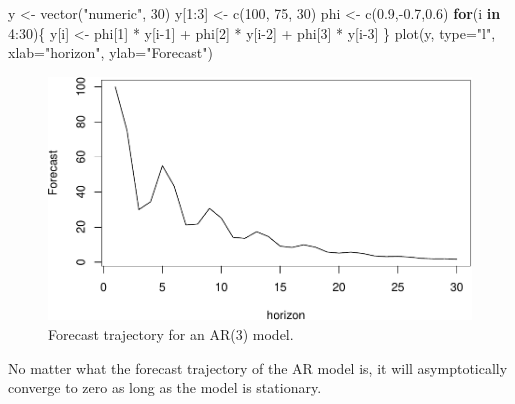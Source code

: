 \documentclass[
]{book}
\newenvironment{Shaded}{\begin{snugshade}}{\end{snugshade}}
\newcommand{\AttributeTok}[1]{\textcolor[rgb]{0.77,0.63,0.00}{#1}}
\newcommand{\ControlFlowTok}[1]{\textcolor[rgb]{0.13,0.29,0.53}{\textbf{#1}}}
\newcommand{\DecValTok}[1]{\textcolor[rgb]{0.00,0.00,0.81}{#1}}
\newcommand{\FloatTok}[1]{\textcolor[rgb]{0.00,0.00,0.81}{#1}}
\newcommand{\FunctionTok}[1]{\textcolor[rgb]{0.00,0.00,0.00}{#1}}
\newcommand{\NormalTok}[1]{#1}
\newcommand{\OtherTok}[1]{\textcolor[rgb]{0.56,0.35,0.01}{#1}}
\newcommand{\SpecialCharTok}[1]{\textcolor[rgb]{0.00,0.00,0.00}{#1}}
\newcommand{\StringTok}[1]{\textcolor[rgb]{0.31,0.60,0.02}{#1}}
\theoremstyle{definition}
\theoremstyle{definition}
\theoremstyle{definition}
\theoremstyle{definition}
\theoremstyle{remark}
\begin{document}
\begin{Shaded}
\begin{Highlighting}[]
\NormalTok{y }\OtherTok{\textless{}{-}} \FunctionTok{vector}\NormalTok{(}\StringTok{"numeric"}\NormalTok{, }\DecValTok{30}\NormalTok{)}
\NormalTok{y[}\DecValTok{1}\SpecialCharTok{:}\DecValTok{3}\NormalTok{] }\OtherTok{\textless{}{-}} \FunctionTok{c}\NormalTok{(}\DecValTok{100}\NormalTok{, }\DecValTok{75}\NormalTok{, }\DecValTok{30}\NormalTok{)}
\NormalTok{phi }\OtherTok{\textless{}{-}} \FunctionTok{c}\NormalTok{(}\FloatTok{0.9}\NormalTok{,}\SpecialCharTok{{-}}\FloatTok{0.7}\NormalTok{,}\FloatTok{0.6}\NormalTok{)}
\ControlFlowTok{for}\NormalTok{(i }\ControlFlowTok{in} \DecValTok{4}\SpecialCharTok{:}\DecValTok{30}\NormalTok{)\{}
\NormalTok{    y[i] }\OtherTok{\textless{}{-}}\NormalTok{ phi[}\DecValTok{1}\NormalTok{] }\SpecialCharTok{*}\NormalTok{ y[i}\DecValTok{{-}1}\NormalTok{] }\SpecialCharTok{+}\NormalTok{ phi[}\DecValTok{2}\NormalTok{] }\SpecialCharTok{*}\NormalTok{ y[i}\DecValTok{{-}2}\NormalTok{] }\SpecialCharTok{+}\NormalTok{ phi[}\DecValTok{3}\NormalTok{] }\SpecialCharTok{*}\NormalTok{ y[i}\DecValTok{{-}3}\NormalTok{]}
\NormalTok{\}}
\FunctionTok{plot}\NormalTok{(y, }\AttributeTok{type=}\StringTok{"l"}\NormalTok{, }\AttributeTok{xlab=}\StringTok{"horizon"}\NormalTok{, }\AttributeTok{ylab=}\StringTok{"Forecast"}\NormalTok{)}
\end{Highlighting}
\end{Shaded}

\begin{figure}
\centering
\includegraphics{Svetunkov--2022----ADAM_files/figure-latex/AR3Trajectory-1.pdf}
\caption{\label{fig:AR3Trajectory}Forecast trajectory for an AR(3) model.}
\end{figure}

No matter what the forecast trajectory of the AR model is, it will asymptotically converge to zero as long as the model is stationary.
\end{document}
